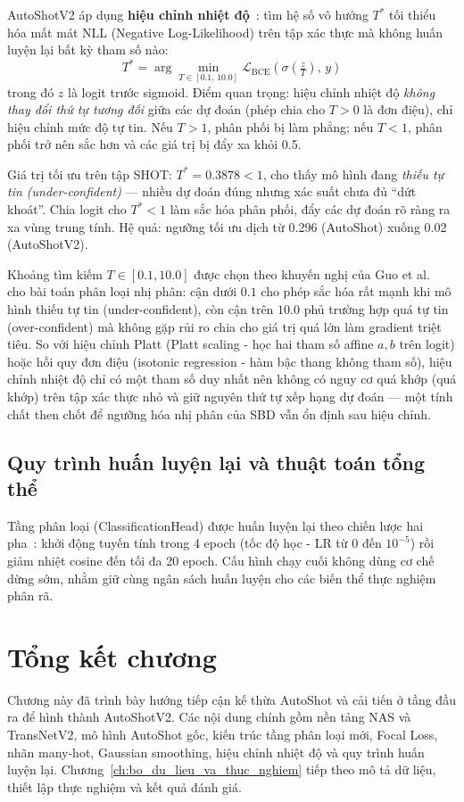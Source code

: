 AutoShotV2 áp dụng \textbf{hiệu chỉnh nhiệt độ}~\cite{Guo2017Calibration}: tìm hệ số vô hướng $T^*$ tối thiểu hóa mất mát NLL (Negative Log-Likelihood) trên tập xác thực mà không huấn luyện lại bất kỳ tham số nào:
\begin{equation}
    T^* = \arg\min_{T \in [0.1,\,10.0]} \mathcal{L}_{\text{BCE}}\!\left(\sigma\!\left(\tfrac{z}{T}\right),\,y\right)
    \label{eq:temperature_scaling}
\end{equation}
trong đó $z$ là logit trước sigmoid. Điểm quan trọng: hiệu chỉnh nhiệt độ \textit{không thay đổi thứ tự tương đối} giữa các dự đoán (phép chia cho $T > 0$ là đơn điệu), chỉ hiệu chỉnh mức độ tự tin. Nếu $T > 1$, phân phối bị làm phẳng; nếu $T < 1$, phân phối trở nên sắc hơn và các giá trị bị đẩy xa khỏi 0.5.

Giá trị tối ưu trên tập SHOT: $T^* = 0.3878 < 1$, cho thấy mô hình đang \textit{thiếu tự tin (under-confident)} --- nhiều dự đoán đúng nhưng xác suất chưa đủ ``dứt khoát''. Chia logit cho $T^* < 1$ làm sắc hóa phân phối, đẩy các dự đoán rõ ràng ra xa vùng trung tính. Hệ quả: ngưỡng tối ưu dịch từ 0.296 (AutoShot) xuống 0.02 (AutoShotV2).

Khoảng tìm kiếm $T \in [0.1, 10.0]$ được chọn theo khuyến nghị của Guo et al.\ \cite{Guo2017Calibration} cho bài toán phân loại nhị phân: cận dưới $0.1$ cho phép sắc hóa rất mạnh khi mô hình thiếu tự tin (under-confident), còn cận trên $10.0$ phủ trường hợp quá tự tin (over-confident) mà không gặp rủi ro chia cho giá trị quá lớn làm gradient triệt tiêu. So với hiệu chỉnh Platt (Platt scaling - học hai tham số affine $a, b$ trên logit) hoặc hồi quy đơn điệu (isotonic regression - hàm bậc thang không tham số), hiệu chỉnh nhiệt độ chỉ có một tham số duy nhất nên không có nguy cơ quá khớp (quá khớp) trên tập xác thực nhỏ và giữ nguyên thứ tự xếp hạng dự đoán --- một tính chất then chốt để ngưỡng hóa nhị phân của SBD vẫn ổn định sau hiệu chỉnh.

\subsection{Quy trình huấn luyện lại và thuật toán tổng thể}
\label{subsec:v2_training}

Tầng phân loại (ClassificationHead) được huấn luyện lại theo chiến lược hai pha~\cite{Loshchilov2016SGDR}: khởi động tuyến tính trong 4 epoch (tốc độ học - LR từ 0 đến $10^{-5}$) rồi giảm nhiệt cosine đến tối đa 20 epoch. Cấu hình chạy cuối không dùng cơ chế dừng sớm, nhằm giữ cùng ngân sách huấn luyện cho các biến thể thực nghiệm phân rã.

\section{Tổng kết chương}
\label{sec:chap3_conclusion}

Chương này đã trình bày hướng tiếp cận kế thừa AutoShot và cải tiến ở tầng đầu ra để hình thành AutoShotV2. Các nội dung chính gồm nền tảng NAS và TransNetV2, mô hình AutoShot gốc, kiến trúc tầng phân loại mới, Focal Loss, nhãn many-hot, Gaussian smoothing, hiệu chỉnh nhiệt độ và quy trình huấn luyện lại. Chương~\ref{ch:bo_du_lieu_va_thuc_nghiem} tiếp theo mô tả dữ liệu, thiết lập thực nghiệm và kết quả đánh giá.
